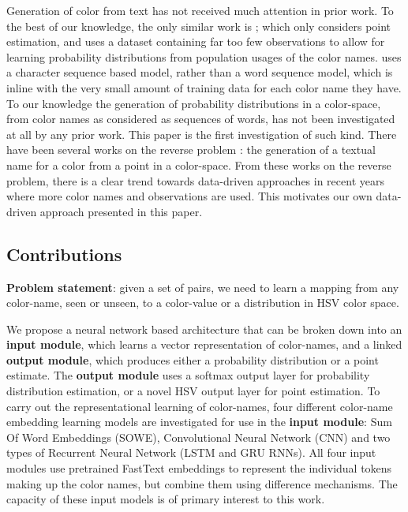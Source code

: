 Generation of color from text has not received much attention in prior work.
To the best of our knowledge, the only similar work is \textcite{DBLP:journals/corr/KawakamiDRS16};
which only considers point estimation,
and uses a dataset containing far too few observations to allow for learning probability distributions from population usages of the color names.
\textcite{DBLP:journals/corr/KawakamiDRS16} uses a character sequence based model, rather than a word sequence model, which is inline with the very small amount of training data for each color name they have.
To our knowledge the generation of probability distributions in a color-space, from color names as considered as  sequences of words, has not been investigated at all by any prior work.
This paper is the first investigation of such kind.
There have been several works on the reverse problem \parencite{mcmahan2015bayesian,meomcmahanstone:color,2016arXiv160603821M}: the generation of a textual name for a color from a point in a color-space.
From these works on the reverse problem, there is a clear trend towards data-driven approaches in recent years where more color names and observations are used.
This motivates our own data-driven approach presented in this paper.




\subsection{Contributions}
{\bf Problem statement}: given a set of \datapairs{} pairs, we need to learn a mapping from any color-name, seen or unseen, to a color-value or a distribution in HSV color space.

We propose a neural network based architecture that can be broken down into an 
\textbf{input module}, which learns a vector representation of color-names,
 and a linked \textbf{output module}, which produces either a probability distribution or a  point estimate.
The \textbf{output module} uses a softmax output layer for probability distribution estimation,
or a novel HSV output layer for point estimation. 
To carry out the representational learning of color-names, four different color-name embedding learning models are investigated for use in the \textbf{input module}: Sum Of Word Embeddings (SOWE), Convolutional Neural Network (CNN) and two types of Recurrent Neural Network (LSTM and GRU RNNs).
All four input modules use pretrained FastText embeddings \parencite{bojanowski2016enriching} to represent the individual tokens making up the color names, but combine them using difference mechanisms.
The capacity of these input models is of primary interest to this work.

